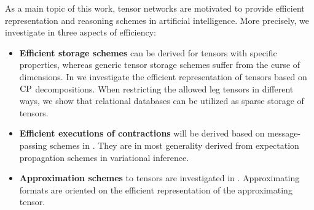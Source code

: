 As a main topic of this work, tensor networks are motivated to provide efficient representation and reasoning schemes in artificial intelligence.
More precisely, we investigate in  three aspects of efficiency:
\begin{itemize}
    \item \textbf{Efficient storage schemes} can be derived for tensors with specific properties, whereas generic tensor storage schemes suffer from the curse of dimensions.
    In  we investigate the efficient representation of tensors based on $\mathrm{CP}$ decompositions.
    When restricting the allowed leg tensors in different ways, we show that relational databases can be utilized as sparse storage of tensors.
    \item \textbf{Efficient executions of contractions} will be derived based on message-passing schemes in .
    They are in most generality derived from expectation propagation schemes in variational inference.
    \item \textbf{Approximation schemes} to tensors are investigated in .
    Approximating formats are oriented on the efficient representation of the approximating tensor.
\end{itemize}

